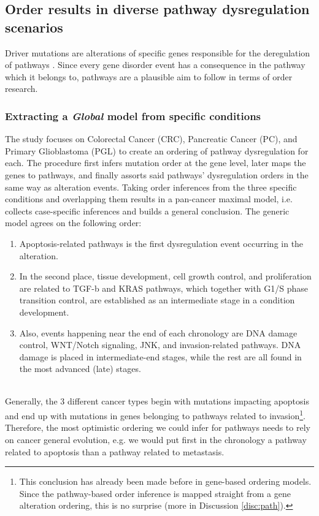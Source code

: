 \subsection{Order results in diverse pathway dysregulation scenarios}
Driver mutations are alterations of specific genes responsible for the deregulation of pathways \cite{Ascolani2019ModelingMatter}. Since every gene disorder event has a consequence in the pathway which it belongs to, pathways are a plausible aim to follow in terms of order research.
\\
\subsubsection{Extracting a \textit{Global} model from specific conditions}
\label{path-global}
The \cite{Gerstung2011TheTumorigenesis} study focuses on Colorectal Cancer (CRC), Pancreatic Cancer (PC), and Primary Glioblastoma (PGL) to create an ordering of pathway dysregulation for each.
The procedure first infers mutation order at the gene level, later maps the genes to pathways, and finally assorts said pathways' dysregulation orders in the same way as alteration events. Taking order inferences from the three specific conditions and overlapping them results in a pan-cancer maximal model, i.e. collects case-specific inferences and builds a general conclusion. The generic model agrees on the following order:

\begin{enumerate}
    \item Apoptosis-related pathways is the first dysregulation event occurring in the alteration.
    \item In the second place, tissue development, cell growth control, and proliferation are related to TGF-b and KRAS pathways, which together with G1/S phase transition control, are established as an intermediate stage in a condition development.
    \item Also, events happening near the end of each chronology are DNA damage control, WNT/Notch signaling, JNK, and invasion-related pathways. DNA damage is placed in intermediate-end stages, while the rest are all found in the most advanced (late) stages.
\end{enumerate}
\\

Generally, the 3 different cancer types begin with mutations impacting apoptosis and end up with mutations in genes belonging to pathways related to invasion\footnote{This conclusion has already been made before in gene-based ordering models. Since the pathway-based order inference is mapped straight from a gene alteration ordering, this is no surprise (more in Discussion \ref{disc:path}).}. Therefore, the most optimistic ordering we could infer for pathways needs to rely on cancer general evolution, e.g. we would put first in the chronology a pathway related to apoptosis than a pathway related to metastasis.
\\

